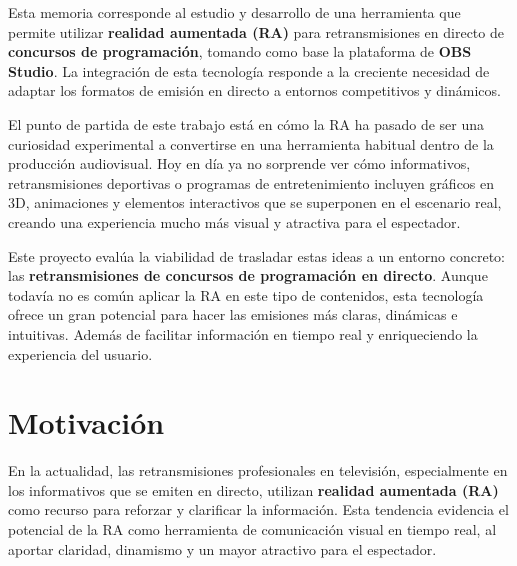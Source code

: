 

    Esta memoria corresponde al estudio y desarrollo de una herramienta que permite utilizar \textbf{realidad aumentada (RA)} para retransmisiones en directo de \textbf{concursos de programación}, tomando como base la plataforma de \textbf{OBS Studio}. La integración de esta tecnología responde a la creciente necesidad de adaptar los formatos de emisión en directo a entornos competitivos y dinámicos.
    
    El punto de partida de este trabajo está en cómo la RA ha pasado de ser una curiosidad experimental a convertirse en una herramienta habitual dentro de la producción audiovisual. Hoy en día ya no sorprende ver cómo informativos, retransmisiones deportivas o programas de entretenimiento incluyen gráficos en 3D, animaciones y elementos interactivos que se superponen en el escenario real, creando una experiencia mucho más visual y atractiva para el espectador.

Este proyecto evalúa la viabilidad de trasladar estas ideas a un entorno concreto: las \textbf{retransmisiones de concursos de programación en directo}. Aunque todavía no es común aplicar la RA en este tipo de contenidos, esta tecnología ofrece un gran potencial para hacer las emisiones más claras, dinámicas e intuitivas. Además de facilitar información en tiempo real y enriqueciendo la experiencia del usuario.
    
    \section{Motivación}
    
    En la actualidad, las retransmisiones profesionales en televisión, especialmente en los informativos que se emiten en directo, utilizan \textbf{realidad aumentada (RA)} como recurso para reforzar y clarificar la información. Esta tendencia evidencia el potencial de la RA como herramienta de comunicación visual en tiempo real, al aportar claridad, dinamismo y un mayor atractivo para el espectador.
    
